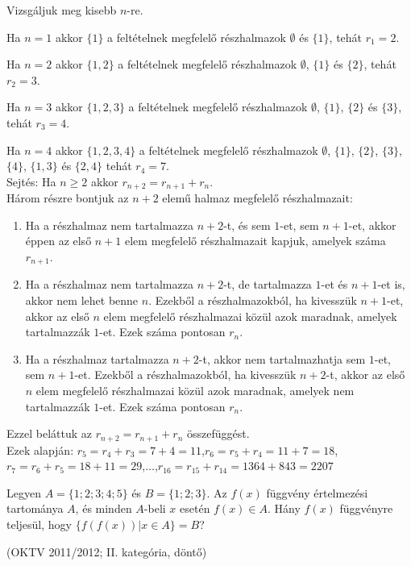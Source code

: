 \begin{solution}
	Vizsgáljuk meg kisebb $n$-re.
	
	Ha $n=1$ akkor $\{1\}$ a feltételnek megfelelő részhalmazok $\emptyset$
	és $\{1\}$, tehát $r_{1}=2$.
	
	Ha $n=2$ akkor $\{1,2\}$ a feltételnek megfelelő részhalmazok $\emptyset$,
	$\{1\}$ és $\{2\}$, tehát $r_{2}=3$.
	
	Ha $n=3$ akkor $\{1,2,3\}$ a feltételnek megfelelő részhalmazok
	$\emptyset$, $\{1\}$, $\{2\}$ és $\{3\}$, tehát $r_{3}=4$.
	
	Ha $n=4$ akkor $\{1,2,3,4\}$ a feltételnek megfelelő részhalmazok
	$\emptyset$, $\{1\}$, $\{2\}$, $\{3\}$, $\{4\}$, $\{1,3\}$ és
	$\{2,4\}$ tehát $r_{4}=7$.\\
	
	Sejtés: Ha $n\geq2$ akkor $r_{n+2}=r_{n+1}+r_{n}$.\\
	
	Három részre bontjuk az $n+2$ elemű halmaz megfelelő részhalmazait:
	\begin{enumerate}
		\item Ha a részhalmaz nem tartalmazza $n+2$-t, és sem $1$-et, sem $n+1$-et,
		akkor éppen az első $n+1$ elem megfelelő részhalmazait kapjuk, amelyek
		száma $r_{n+1}$.
		\item Ha a részhalmaz nem tartalmazza $n+2$-t, de tartalmazza $1$-et és
		$n+1$-et is, akkor nem lehet benne $n$. Ezekből a részhalmazokból,
		ha kivesszük $n+1$-et, akkor az első $n$ elem megfelelő részhalmazai
		közül azok maradnak, amelyek tartalmazzák $1$-et. Ezek száma pontosan
		$r_{n}$.
		\item Ha a részhalmaz tartalmazza $n+2$-t, akkor nem tartalmazhatja sem
		$1$-et, sem $n+1$-et. Ezekből a részhalmazokból, ha kivesszük $n+2$-t,
		akkor az első $n$ elem megfelelő részhalmazai közül azok maradnak,
		amelyek nem tartalmazzák $1$-et. Ezek száma pontosan $r_{n}$.
	\end{enumerate}
	Ezzel beláttuk az $r_{n+2}=r_{n+1}+r_{n}$ összefüggést.\\
	
	Ezek alapján: $r_{5}=r_{4}+r_{3}=7+4=11$,$r_{6}=r_{5}+r_{4}=11+7=18$,$r_{7}=r_{6}+r_{5}=18+11=29$,$\dots$,$r_{16}=r_{15}+r_{14}=1364+843=2207$
\end{solution}
\begin{extraproblem}
	Legyen $A=\{1;2;3;4;5\}$ és $B=\{1;2;3\}$. Az $f(x)$ függvény
	értelmezési tartománya $A$, és minden $A$-beli $x$ esetén $f(x)\in A$.
	Hány $f(x)$ függvényre teljesül, hogy $\{f(f(x))|x\in A\}=B$?
	
	(OKTV 2011/2012; II. kategória, döntő) 
\end{extraproblem}
